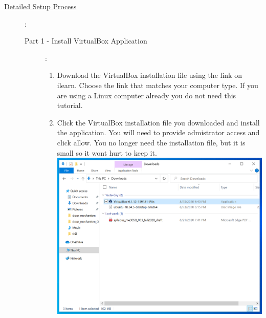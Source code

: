 \documentclass[12pt]{article}
\begin{document}
\begin{description}
			
                    
  

\newpage

\item[\underline{Detailed Setup Process}]: 

\begin{description} 
	

\item [Part 1 - Install VirtualBox Application]: \vspace{0mm}\\ 


\begin{enumerate}[label=\alph*)]
	
	\item Download the VirtualBox installation file using the link on ilearn. Choose the link that matches your computer type. If you are using a Linux computer already you do not need this tutorial. \vspace{5mm}
	
	\item Click the VirtualBox installation file you downloaded and install the application. You will need to provide admistrator access and click allow. You no longer need the installation file, but it is small so it wont hurt to keep it. \vspace{5mm} \\
	
	\hspace*{-2.5cm}\includegraphics[scale=.6]{Capture1.png}\\


\end{enumerate}
\end{description}
\end{description}
\end{document}
